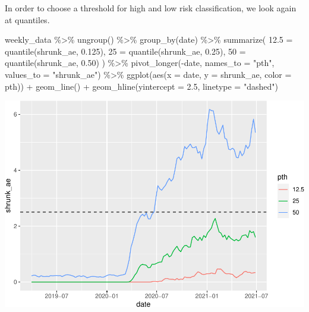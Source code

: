 \documentclass[
]{article}
\newenvironment{Shaded}{\begin{snugshade}}{\end{snugshade}}
\newcommand{\AttributeTok}[1]{\textcolor[rgb]{0.77,0.63,0.00}{#1}}
\newcommand{\FloatTok}[1]{\textcolor[rgb]{0.00,0.00,0.81}{#1}}
\newcommand{\FunctionTok}[1]{\textcolor[rgb]{0.00,0.00,0.00}{#1}}
\newcommand{\NormalTok}[1]{#1}
\newcommand{\OtherTok}[1]{\textcolor[rgb]{0.56,0.35,0.01}{#1}}
\newcommand{\SpecialCharTok}[1]{\textcolor[rgb]{0.00,0.00,0.00}{#1}}
\newcommand{\StringTok}[1]{\textcolor[rgb]{0.31,0.60,0.02}{#1}}
\begin{document}
In order to choose a threshold for high and low risk classification, we
look again at quantiles.

\begin{Shaded}
\begin{Highlighting}[]
\NormalTok{weekly\_data }\SpecialCharTok{\%\textgreater{}\%}
  \FunctionTok{ungroup}\NormalTok{() }\SpecialCharTok{\%\textgreater{}\%}
  \FunctionTok{group\_by}\NormalTok{(date) }\SpecialCharTok{\%\textgreater{}\%}
  \FunctionTok{summarize}\NormalTok{(}
      \StringTok{\textasciigrave{}}\AttributeTok{12.5}\StringTok{\textasciigrave{}} \OtherTok{=} \FunctionTok{quantile}\NormalTok{(shrunk\_ae, }\FloatTok{0.125}\NormalTok{),}
      \StringTok{\textasciigrave{}}\AttributeTok{25}\StringTok{\textasciigrave{}} \OtherTok{=} \FunctionTok{quantile}\NormalTok{(shrunk\_ae, }\FloatTok{0.25}\NormalTok{),}
      \StringTok{\textasciigrave{}}\AttributeTok{50}\StringTok{\textasciigrave{}} \OtherTok{=} \FunctionTok{quantile}\NormalTok{(shrunk\_ae, }\FloatTok{0.50}\NormalTok{)}
\NormalTok{  ) }\SpecialCharTok{\%\textgreater{}\%}
  \FunctionTok{pivot\_longer}\NormalTok{(}\SpecialCharTok{{-}}\NormalTok{date, }\AttributeTok{names\_to =} \StringTok{"pth"}\NormalTok{, }\AttributeTok{values\_to =} \StringTok{"shrunk\_ae"}\NormalTok{) }\SpecialCharTok{\%\textgreater{}\%}
  \FunctionTok{ggplot}\NormalTok{(}\FunctionTok{aes}\NormalTok{(}\AttributeTok{x =}\NormalTok{ date, }\AttributeTok{y =}\NormalTok{ shrunk\_ae, }\AttributeTok{color =}\NormalTok{ pth)) }\SpecialCharTok{+}
  \FunctionTok{geom\_line}\NormalTok{() }\SpecialCharTok{+}
  \FunctionTok{geom\_hline}\NormalTok{(}\AttributeTok{yintercept =} \FloatTok{2.5}\NormalTok{, }\AttributeTok{linetype =} \StringTok{"dashed"}\NormalTok{)}
\end{Highlighting}
\end{Shaded}

\includegraphics{figures/report/fig-unnamed-chunk-38-1.pdf}
\end{document}
